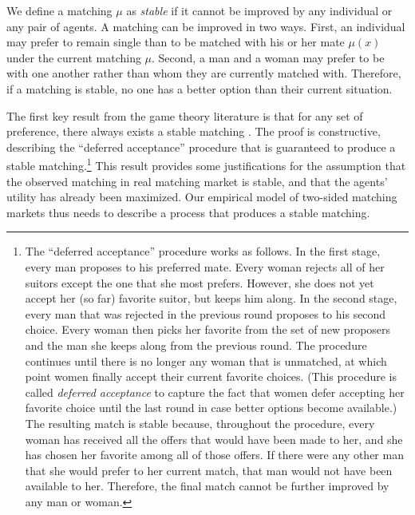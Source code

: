 We define a matching $\mu$ as \textit{stable} if it cannot be improved by any
individual or any pair of agents. A matching can be improved in two ways. First,
an individual may prefer to remain single than to be matched with his or her
mate $\mu(x)$ under the current matching $\mu$. Second, a man and a woman may
prefer to be with one another rather than whom they are currently matched with.
Therefore, if a matching is stable, no one has a better option than their
current situation.

The first key result from the game theory literature is that for any set of
preference, there always exists a stable matching \citep{Gale1962}. The proof is
constructive, describing the ``deferred acceptance'' procedure that is
guaranteed to produce a stable matching.\footnote{The ``deferred acceptance''
  procedure works as follows. In the first stage, every man proposes to his
  preferred mate. Every woman rejects all of her suitors except the one that she
  most prefers. However, she does not yet accept her (so far) favorite suitor,
  but keeps him along. In the second stage, every man that was rejected in the
  previous round proposes to his second choice. Every woman then picks her
  favorite from the set of new proposers and the man she keeps along from the
  previous round. The procedure continues until there is no longer any woman
  that is unmatched, at which point women finally accept their current favorite
  choices. (This procedure is called \textit{deferred acceptance} to capture the
  fact that women defer accepting her favorite choice until the last round in
  case better options become available.) The resulting match is stable because,
  throughout the procedure, every woman has received all the offers that would
  have been made to her, and she has chosen her favorite among all of those
  offers. If there were any other man that she would prefer to her current
  match, that man would not have been available to her. Therefore, the final
  match cannot be further improved by any man or woman.} This result provides
some justifications for the assumption that the observed matching in real
matching market is stable, and that the agents' utility has already been
maximized. Our empirical model of two-sided matching markets thus needs to
describe a process that produces a stable matching.

